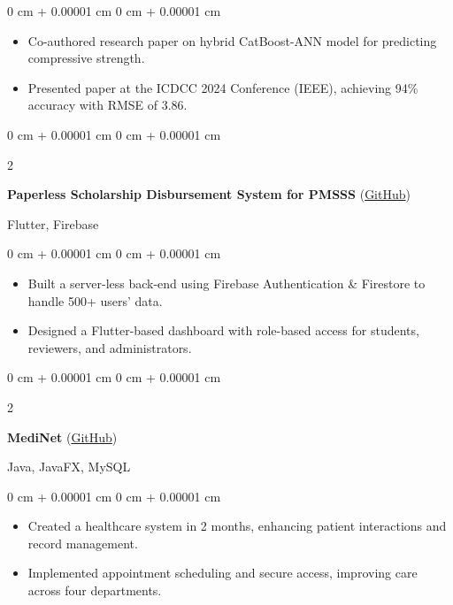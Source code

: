 \documentclass[11pt, letterpaper]{article}
\newenvironment{highlights}{
    \begin{itemize}[
        topsep=0.10 cm,
        parsep=0.10 cm,
        partopsep=0pt,
        itemsep=0pt,
        leftmargin=0 cm + 10pt
    ]
}{
    \end{itemize}
} %
\newenvironment{onecolentry}{
    \begin{adjustwidth}{
        0 cm + 0.00001 cm
    }{
        0 cm + 0.00001 cm
    }
}{
    \end{adjustwidth}
} %
\newenvironment{twocolentry}[2][]{
    \onecolentry
    \def\secondColumn{#2}
    \setcolumnwidth{\fill, 4.5 cm}
    \begin{paracol}{2}
}{
    \switchcolumn \raggedleft \secondColumn
    \end{paracol}
    \endonecolentry
} %
\begin{document}
\begin{onecolentry}
    \begin{highlights}
        \item Co-authored research paper on hybrid CatBoost-ANN model for predicting compressive strength.
        \item Presented paper at the ICDCC 2024 Conference (IEEE), achieving 94\% accuracy with RMSE of 3.86.
    \end{highlights}
\end{onecolentry}

    \vspace{0.2 cm}

        \begin{twocolentry}{
            Flutter, Firebase
            }
            \textbf{Paperless Scholarship Disbursement System for PMSSS} (\href{https://github.com/Lalith17/Paperless-Scholarship-Disbursement-System-for-PMSS}{GitHub})
\end{twocolentry}

        \vspace{0.10 cm}
        \begin{onecolentry}
            \begin{highlights}
                \item Built a server-less back-end using Firebase Authentication \& Firestore to handle 500+ users’ data.  
                \item Designed a Flutter-based dashboard with role-based access for students, reviewers, and administrators.
            \end{highlights}
        \end{onecolentry}


        \vspace{0.2 cm}

        \begin{twocolentry}{
    {Java, JavaFX, MySQL}
}
    \textbf{MediNet} (\href{https://github.com/Lalith17/MediNet}{GitHub})
\end{twocolentry}

\vspace{0.10 cm}

\begin{onecolentry}
    \begin{highlights}
        \item Created a healthcare system in 2 months, enhancing patient interactions and record management.
        \item Implemented appointment scheduling and secure access, improving care across four departments.
    \end{highlights}
\end{onecolentry}
\end{document}
